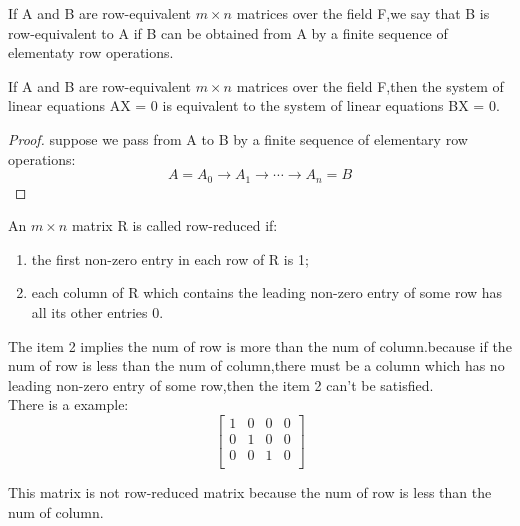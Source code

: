 \begin{theorem}
	If A and B are row-equivalent \(m \times n\) matrices over the field F,we say that B is row-equivalent to A if B can be obtained from A by a finite sequence of elementaty row operations.
	\label{thm:row_equivalent}
\end{theorem}


\begin{theorem}
	If A and B are row-equivalent \(m \times n\) matrices over the field F,then the system of linear equations AX = 0 is equivalent to the system of linear equations BX = 0.
\end{theorem}

\begin{proof}
	suppose we pass from A to B by a finite sequence of elementary row operations:
	\begin{equation}
		A = A_0 \rightarrow A_1 \rightarrow \cdots \rightarrow A_n = B
		\label{eq:proof_row_equivalent have same solution}
	\end{equation}
\end{proof}

\begin{definition}
	An $m \times n$ matrix R is called row-reduced if:
	\begin{enumerate}
		\item the first non-zero entry in each row of R is 1;
		\item each column of R which contains the leading non-zero entry of some row has all its other entries 0.
	\end{enumerate}
	\label{def:row_reduced_matrix}
\end{definition}
\begin{remark}
	The item 2 implies the num of row is more than the num of column.because if the num of row is less than the num of column,there must be a column which has no leading non-zero entry of some row,then the item 2 can't be satisfied.
	\\ There is a example:
	\begin{equation*}
		\begin{bmatrix}
			1 & 0 & 0 & 0 \\
			0 & 1 & 0 & 0 \\
			0 & 0 & 1 & 0 \\
		\end{bmatrix}
	\end{equation*}

	This matrix is not row-reduced matrix because the num of row is less than the num of column.

\end{remark}

